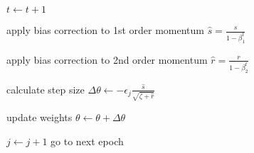 \documentclass{article}
\begin{document}
\begin{algorithm}
{{			$t \gets t + 1$		
			
			apply bias correction to 1st order momentum $\hat{s} = \frac{s}{1-\beta_{1}^{t}}$
			
			apply bias correction to 2nd order momentum $\hat{r} = \frac{r}{1-\beta_{2}^{t}}$
			
			calculate step size $\Delta \theta \gets - \epsilon_{j} \frac{\hat{s}}{\sqrt{\zeta+\hat{r}}}$

			update weights $\theta \gets \theta + \Delta \theta $

		}
				
		$j \gets j + 1$ go to next epoch 
	
	}        


    \end{algorithm}    
    
\end{document}
